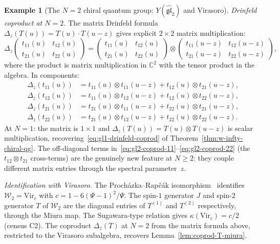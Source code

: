 \documentclass[11pt,reqno]{amsart}
\theoremstyle{definition}
\newtheorem{example}[theorem]{Example}
\theoremstyle{remark}
\newcommand{\cW}{\mathcal{W}}
\newcommand{\CC}{\mathbb{C}}
\numberwithin{equation}{section}
\begin{document}
\begin{example}[The $N = 2$ chiral quantum group:
$Y(\widehat{\mathfrak{gl}}_2)$ and Virasoro]
\medskip
\emph{Drinfeld coproduct at $N = 2$.}
The matrix Drinfeld formula
$\Delta_z(T(u)) = T(u) \cdot T(u - z)$
gives explicit $2 \times 2$ matrix multiplication:
\begin{equation}\label{eq:gl2-coprod-matrix}
  \Delta_z\!\begin{pmatrix}
    t_{11}(u) & t_{12}(u) \\
    t_{21}(u) & t_{22}(u)
  \end{pmatrix}
  =
  \begin{pmatrix}
    t_{11}(u) & t_{12}(u) \\
    t_{21}(u) & t_{22}(u)
  \end{pmatrix}
  \!\otimes\!
  \begin{pmatrix}
    t_{11}(u-z) & t_{12}(u-z) \\
    t_{21}(u-z) & t_{22}(u-z)
  \end{pmatrix}\!,
\end{equation}
where the product is matrix multiplication in $\CC^2$ with
the tensor product in the algebra. In components:
\begin{align}\label{eq:gl2-coprod-11}
  \Delta_z(t_{11}(u))
  &= t_{11}(u) \otimes t_{11}(u - z)
  + t_{12}(u) \otimes t_{21}(u - z), \\
  \label{eq:gl2-coprod-12}
  \Delta_z(t_{12}(u))
  &= t_{11}(u) \otimes t_{12}(u - z)
  + t_{12}(u) \otimes t_{22}(u - z), \\
  \label{eq:gl2-coprod-21}
  \Delta_z(t_{21}(u))
  &= t_{21}(u) \otimes t_{11}(u - z)
  + t_{22}(u) \otimes t_{21}(u - z), \\
  \label{eq:gl2-coprod-22}
  \Delta_z(t_{22}(u))
  &= t_{21}(u) \otimes t_{12}(u - z)
  + t_{22}(u) \otimes t_{22}(u - z).
\end{align}
At $N = 1$: the matrix is $1 \times 1$ and
$\Delta_z(T(u)) = T(u) \otimes T(u-z)$ is scalar
multiplication, recovering~\eqref{eq:gl1-drinfeld-coprod}
of Theorem~\ref{thm:w-infty-chiral-qg}. The off-diagonal
terms in~\eqref{eq:gl2-coprod-11}--\eqref{eq:gl2-coprod-22}
(the $t_{12} \otimes t_{21}$ cross-terms) are the
genuinely new feature at $N \geq 2$: they couple different
matrix entries through the spectral parameter~$z$.

\medskip
\emph{Identification with Virasoro.}
The Proch\'azka--Rap\v{c}\'ak isomorphism~\cite{PR19}
identifies $\cW_2 = \mathrm{Vir}_c$ with
$c = 1 - 6(\Psi - 1)^2/\Psi$. The spin-$1$ generator $J$
and spin-$2$ generator $T$ of $\cW_2$ are the diagonal
entries of $T^{(1)}$ and $T^{(2)}$ respectively, through
the Miura map. The Sugawara-type relation gives
$\kappa(\mathrm{Vir}_c) = c/2$ (census C2). The
coproduct $\Delta_z(T)$ at $N = 2$ from the matrix formula
above, restricted to the Virasoro subalgebra, recovers
Lemma~\ref{lem:coprod-T-miura}.
\end{example}
\end{document}
